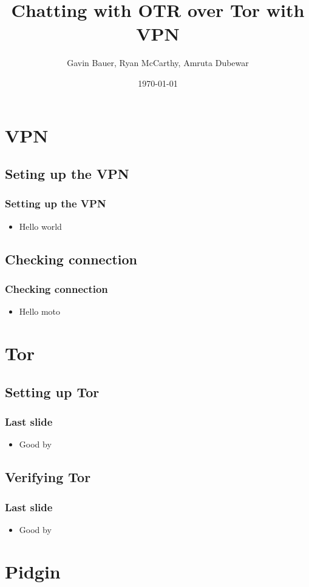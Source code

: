 \documentclass{beamer}
\title{Chatting with OTR over Tor with VPN}
\author{Gavin Bauer, Ryan McCarthy, Amruta Dubewar}
\date{\today}
\begin{document}
\begin{frame}
\maketitle
\end{frame}
\section{VPN}
\subsection{Seting up the VPN}
\begin{frame}
\frametitle{Setting up the VPN}
\begin{itemize}
\item Hello world
\end{itemize}
\end{frame}
\subsection{Checking connection}
\begin{frame}
\frametitle{Checking connection}
\begin{itemize}
\item Hello moto
\end{itemize}
\end{frame}
\section{Tor}
\subsection{Setting up Tor}
\begin{frame}
\frametitle{Last slide}
\begin{itemize}
\item Good by
\end{itemize}
\end{frame}
\subsection{Verifying Tor}
\begin{frame}
\frametitle{Last slide}
\begin{itemize}
\item Good by
\end{itemize}
\end{frame}
\section{Pidgin}
\end{document}
